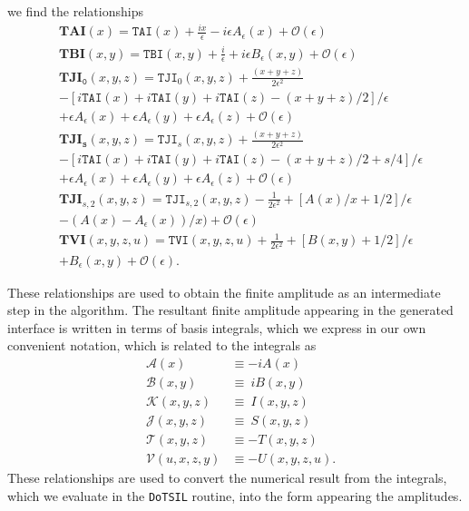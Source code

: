 we find the relationships
\begin{align*}
&\mathtt{\mathbf{TAI} }(x)= \mathtt{TAI}(x)+\frac{ix}{\epsilon} -i\epsilon A_{\epsilon}(x) + \mathcal{O}(\epsilon)\\
&\mathtt{\mathbf{TBI} }(x,y)= \mathtt{TBI}(x,y)+\frac{i}{\epsilon} + i\epsilon B_{\epsilon}(x,y) + \mathcal{O}(\epsilon)\\
&\mathtt{\mathbf{TJI}_0 }(x,y,z)= \mathtt{TJI}_0(x,y,z)+\frac{(x+y+z)}{2\epsilon^2}  \\ & -\left[i\mathtt{TAI}(x)+i\mathtt{TAI}(y)+i\mathtt{TAI}(z)-(x+y+z)/2\right]/\epsilon\\&+ \epsilon A_{\epsilon}(x)+\epsilon A_{\epsilon}(y)+\epsilon A_{\epsilon}(z) +  \mathcal{O}(\epsilon)\\
&\mathtt{\mathbf{TJI}_s }(x,y,z)= \mathtt{TJI}_s(x,y,z)+\frac{(x+y+z)}{2\epsilon^2}  \\ & -\left[i\mathtt{TAI}(x)+i\mathtt{TAI}(y)+i\mathtt{TAI}(z)-(x+y+z)/2+s/4\right]/\epsilon\\&+ \epsilon A_{\epsilon}(x)+\epsilon A_{\epsilon}(y)+\epsilon A_{\epsilon}(z) + \mathcal{O}(\epsilon)\\
&\mathtt{\mathbf{TJI}}_{s,2}(x,y,z)= \mathtt{TJI}_{s,2}(x,y,z) -\frac{1}{2\epsilon^2} +\left[A(x)/x +1/2\right]/\epsilon\\ &- (A(x)- A_{\epsilon}(x))/x)+\mathcal{O}(\epsilon) \\
&\mathtt{\mathbf{TVI}}(x,y,z,u)= \mathtt{TVI}(x,y,z,u) +\frac{1}{2\epsilon^2} +\left[B(x,y) +1/2\right]/\epsilon\\ &+ B_{\epsilon}(x,y)+\mathcal{O}(\epsilon).
\end{align*}

These relationships are used to obtain the finite amplitude as an intermediate step in the \mb algorithm.  The resultant finite amplitude appearing in the generated \tsil interface is written in terms of \tarcer basis integrals, which we express in our own convenient notation, which is related to the \tsil integrals as
\begin{eqnarray*}
&\mathcal{A}(x)      &\equiv   -i A(x)\\
&\mathcal{B}(x,y)    &\equiv   \ i B(x,y)\\
&\mathcal{K}(x,y,z) &\equiv   \ I(x,y,z)\\   
&\mathcal{J}(x,y,z)  &\equiv    \ S(x,y,z) \\
&\mathcal{T}(x,y,z)  &\equiv  - T(x,y,z)\\
&\mathcal{V}(u,x,z,y)&\equiv  - U(x,y,z,u).
\end{eqnarray*}
These relationships are used to convert the numerical result from the \tsil integrals, which we evaluate in the \lstinline{DoTSIL} routine, into the form appearing the amplitudes.




